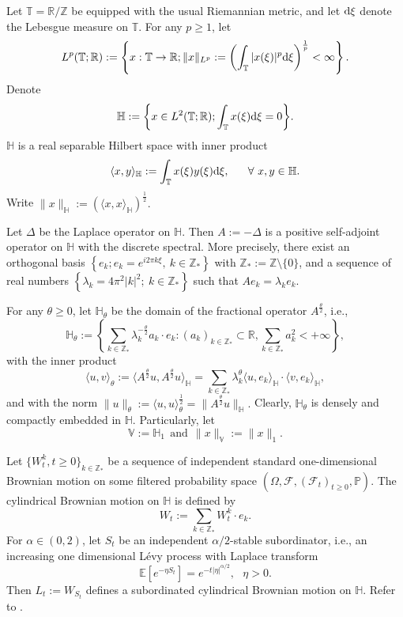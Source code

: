 \documentclass[12pt,a4paper]{article}
\theoremstyle{definition}
\theoremstyle{remark}
\numberwithin{equation}{section}
\newcommand{\T}{\mathbb{T}}
\newcommand{\Ll}{\langle}
\newcommand{\Rr}{\rangle}
\newcommand{\HH}{\mathbb{H}}
\newcommand{\VV}{\mathbb{V}}
\newcommand{\R}{\mathbb{R}}
\newcommand{\Z}{\mathbb{Z}}
\newcommand{\PP}{\mathbb{P}}
\newcommand{\dif}{{\rm d}}
\def\EE{\mathbb{E}}\def\GG{\mathbb G}\def\HH{\mathbb H}\def\KK{\mathbb K}
\def\RR{\mathbb{R}}\def\WW{\mathbb W}\def\ZZ{\mathbb Z}
\begin{document}
{Let $\T= \R/\Z$ be equipped with the usual Riemannian metric, and let $\dif \xi$
denote the Lebesgue measure on $\T$. For any $p\ge1$, let
$$
L^p(\T;\R):=\left\{x: \T\rightarrow\R; \|x\|_{L^p}:=\left(\int_\T |x(\xi)|^p \dif\xi\right)^{\frac1p}<\infty\right\}.
 $$
Denote
$$\HH:=\bigg\{x\in L^2(\T; \R); \int_\T x(\xi) \dif\xi =0\bigg\}.$$
$\HH$ is a real separable Hilbert space with inner product
$$\Ll x,y \Rr_{\HH}:=\int_\T x(\xi)y(\xi) \dif\xi,\ \ \ \ \ \forall \ x, y \in \HH.$$
Write $\|x\|_{\HH}:= \left(\langle x,x\rangle_{\HH}\right)^{\frac12}.$



Let $\Delta$ be the Laplace operator on $\HH$. Then $A:=-\Delta$ is a positive self-adjoint operator on $\HH$ with the discrete spectral. More precisely, there exist  an orthogonal basis $\left\{e_k; e_k=e^{i2 \pi k\xi}, \ k \in \Z_*\right\}$ with   $\Z_*:=\Z \setminus \{0\}$,   and a sequence of real numbers  $\left\{\lambda_k=4 \pi^2 |k|^2; \ k \in \Z_*\right \}$ such that $A e_k=\lambda_k e_k$.

 For any $\theta\ge 0$,  let $ \HH_{\theta}$ be the domain of the fractional operator $A^{\frac{\theta}{2}}$, i.e.,
 $$
 \HH_{\theta}:=\left\{\sum_{k\in \Z_*}\lambda_k^{-\frac{\theta}{2}}a_k\cdot e_k:(a_k)_{k\in \Z_*}\subset\RR, \sum_{k\in \Z_*}a_k^2<+\infty \right\},
  $$
 with the inner product
 $$
 \langle u,v\rangle_{\theta}:=\langle A^{\frac{\theta}{2}}u,A^{\frac{\theta}{2}}u\rangle_{\HH}=\sum_{k\in \Z_*} \lambda_k^{\theta}\langle u, e_k\rangle_{\HH}\cdot\langle v, e_k\rangle_{\HH},
 $$
 and with the norm
$\|u\|_{\theta}:=\langle u,u\rangle_{\theta}^{\frac12}=\|A^{\frac{\theta}{2}} u\|_{\HH}.
 $
Clearly, $ \HH_{\theta}$ is densely and compactly embedded in $\HH$. Particularly, let
$$
\VV:=\HH_{1}\ \ \text{and}\ \  \|x\|_{\VV}:=\|x\|_{1}.
$$


\vskip0.3cm
Let $\{W_t^k,t\ge0\}_{k \in \Z_*}$ be a sequence of independent standard one-dimensional Brownian motion on some filtered probability space $(\Omega, \mathcal F,(\mathcal F_t)_{t\ge0},\PP)$. The cylindrical Brownian motion on $\HH$ is defined by
$$
W_t:=\sum_{k\in \Z_*} W_t^k\cdot e_k.
$$
For $\alpha\in (0,2)$, let $S_t$ be an independent $\alpha/2$-stable subordinator, i.e., an increasing one dimensional L\'evy process with Laplace transform
$$
\EE\left[e^{-\eta S_t} \right]=e^{-t|\eta|^{\alpha/2}}, \ \ \ \eta>0.
$$
Then
$
L_t:=W_{S_t}
$
defines a subordinated cylindrical Brownian motion  on $\HH$. Refer to \cite{Ap09, sato}.

}
\end{document}
